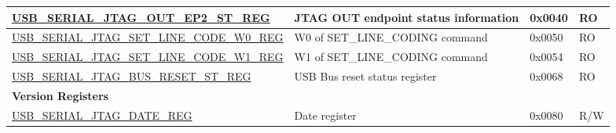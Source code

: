 \begin{longtable}{ | p{7.3cm} | p{5.7cm} | p{1.2cm} | p{1.5cm} | }
    \hyperref[regdesc:USBSERIALJTAGOUTEP2STREG]{USB\_SERIAL\_JTAG\_OUT\_EP2\_ST\_REG} & JTAG OUT endpoint status information & 0x0040 & RO \\ \hline
    \hyperref[regdesc:USBSERIALJTAGSETLINECODEW0REG]{USB\_SERIAL\_JTAG\_SET\_LINE\_CODE\_W0\_REG} & W0 of SET\_LINE\_CODING command & 0x0050 & RO \\ \hline
    \hyperref[regdesc:USBSERIALJTAGSETLINECODEW1REG]{USB\_SERIAL\_JTAG\_SET\_LINE\_CODE\_W1\_REG} & W1 of SET\_LINE\_CODING command & 0x0054 & RO \\ \hline
    \hyperref[regdesc:USBSERIALJTAGBUSRESETSTREG]{USB\_SERIAL\_JTAG\_BUS\_RESET\_ST\_REG} & USB Bus reset status register & 0x0068 & RO \\ \hline
    \multicolumn{4}{|l|}{\textbf{Version Registers}} \\ \hline
    \hyperref[regdesc:USBSERIALJTAGDATEREG]{USB\_SERIAL\_JTAG\_DATE\_REG} & Date register & 0x0080 & R/W \\ \hline
    \end{longtable}
